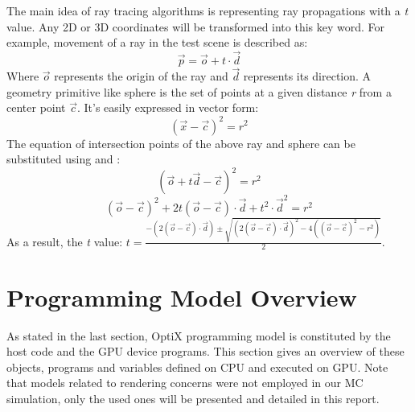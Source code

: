 The main idea of ray tracing algorithms is representing ray propagations with a \textit{t} value. Any 2D or 3D coordinates will be transformed into this key word. For example, movement of a ray in the test scene is described as: 
\begin{equation}
	\vec{p} = \vec{o} + t\cdot\vec{d}
	\label{eq:1}
\end{equation}
Where $\vec{o}$ represents the origin of the ray and $\vec{d}$ represents its direction. A geometry primitive like sphere is the set of points at a given distance \textit{r} from a center point $\vec{c}$. It's easily expressed in vector form:
\begin{equation}
	(\vec{x} - \vec{c})^2 = r^2
	\label{eq:2}
\end{equation}
The equation of intersection points of the above ray and sphere can be substituted using  and :
\begin{equation}
	(\vec{o} + t\vec{d} - \vec{c})^2 = r^2
\end{equation}
\begin{equation}
	(\vec{o} - \vec{c})^2 + 2t(\vec{o} - \vec{c})\cdot\vec{d} + t^2\cdot\vec{d}^2 = r^2
\end{equation}
As a result, the \textit{t} value: $t={\frac{-(2(\vec{o} - \vec{c})\cdot\vec{d})\pm\sqrt{(2(\vec{o} - \vec{c})\cdot\vec{d})^2-4((\vec{o} - \vec{c})^2-r^2)}}{2}}$.

\section{Programming Model Overview}
As stated in the last section, OptiX programming model is constituted by the host code and the GPU device programs. This section gives an overview of these objects, programs and variables defined on CPU and executed on GPU. Note that models related to rendering concerns were not employed in our MC simulation, only the used ones will be presented and detailed in this report.


